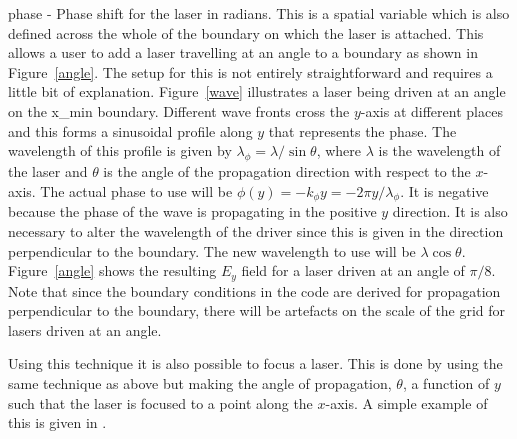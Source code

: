 {\emphtext phase} - Phase shift for the laser in radians. This is a spatial
variable which is also defined across the whole of the boundary on which the
laser is attached. This allows a user to add a laser travelling at an angle
to a boundary as shown in Figure~\ref{angle}.
The setup for this is not entirely straightforward and requires a little
bit of explanation. Figure~\ref{wave} illustrates a laser being driven at
an angle on the x\_min boundary. Different wave fronts cross the $y$-axis
at different places and this forms a sinusoidal profile along $y$ that
represents the phase. The wavelength of this profile is
given by $\lambda_\phi = \lambda / \sin\theta$, where $\lambda$ is the
wavelength of the laser and $\theta$ is the angle of the propagation
direction with respect to the $x$-axis. The actual phase to use will
be $\phi(y) = -k_\phi y = -2\pi y / \lambda_\phi$. It is negative because
the phase of the wave is propagating in the positive $y$ direction.
It is also necessary to alter the wavelength of the driver since this
is given in the direction perpendicular to the boundary. The new
wavelength to use will be $\lambda\cos\theta$. Figure~\ref{angle} shows
the resulting $E_y$ field for a laser driven at an angle of $\pi / 8$. Note
that since the boundary conditions in the code are derived for propagation
perpendicular to the boundary, there will be artefacts on the scale of the
grid for lasers driven at an angle.

Using this technique it is also possible to focus a laser. This is done by
using the same technique as above but making the angle of propagation,
$\theta$, a function of $y$ such that the laser is focused to a point along
the $x$-axis. A simple example of this is given in .




